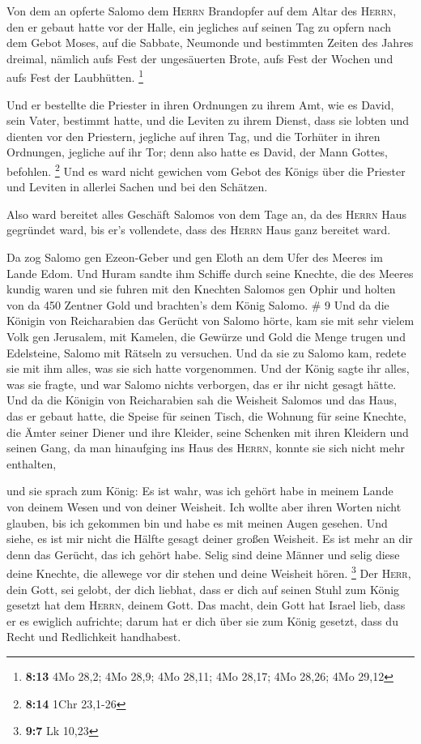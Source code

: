  Von dem an opferte Salomo dem \textsc{Herrn} Brandopfer
auf dem Altar des \textsc{Herrn}, den er gebaut hatte vor der Halle,
 ein jegliches auf seinen Tag zu opfern nach dem Gebot
Moses, auf die Sabbate, Neumonde und bestimmten Zeiten des Jahres
dreimal, nämlich aufs Fest der ungesäuerten Brote, aufs Fest der Wochen
und aufs Fest der Laubhütten. \footnote{\textbf{8:13} 4Mo 28,2; 4Mo
  28,9; 4Mo 28,11; 4Mo 28,17; 4Mo 28,26; 4Mo 29,12}

 Und er bestellte die Priester in ihren Ordnungen zu
ihrem Amt, wie es David, sein Vater, bestimmt hatte, und die Leviten zu
ihrem Dienst, dass sie lobten und dienten vor den Priestern, jegliche
auf ihren Tag, und die Torhüter in ihren Ordnungen, jegliche auf ihr
Tor; denn also hatte es David, der Mann Gottes, befohlen. \footnote{\textbf{8:14}
  1Chr 23,1-26}  Und es ward nicht gewichen vom Gebot des
Königs über die Priester und Leviten in allerlei Sachen und bei den
Schätzen.

 Also ward bereitet alles Geschäft Salomos von dem Tage
an, da des \textsc{Herrn} Haus gegründet ward, bis er's vollendete, dass
des \textsc{Herrn} Haus ganz bereitet ward.

 Da zog Salomo gen Ezeon-Geber und gen Eloth an dem Ufer
des Meeres im Lande Edom.  Und Huram sandte ihm Schiffe
durch seine Knechte, die des Meeres kundig waren und sie fuhren mit den
Knechten Salomos gen Ophir und holten von da 450 Zentner Gold und
brachten's dem König Salomo. \# 9  Und da die Königin von
Reicharabien das Gerücht von Salomo hörte, kam sie mit sehr vielem Volk
gen Jerusalem, mit Kamelen, die Gewürze und Gold die Menge trugen und
Edelsteine, Salomo mit Rätseln zu versuchen. Und da sie zu Salomo kam,
redete sie mit ihm alles, was sie sich hatte vorgenommen. 
Und der König sagte ihr alles, was sie fragte, und war Salomo nichts
verborgen, das er ihr nicht gesagt hätte.  Und da die
Königin von Reicharabien sah die Weisheit Salomos und das Haus, das er
gebaut hatte,  die Speise für seinen Tisch, die Wohnung
für seine Knechte, die Ämter seiner Diener und ihre Kleider, seine
Schenken mit ihren Kleidern und seinen Gang, da man hinaufging ins Haus
des \textsc{Herrn}, konnte sie sich nicht mehr enthalten,

 und sie sprach zum König: Es ist wahr, was ich gehört
habe in meinem Lande von deinem Wesen und von deiner Weisheit.
 Ich wollte aber ihren Worten nicht glauben, bis ich
gekommen bin und habe es mit meinen Augen gesehen. Und siehe, es ist mir
nicht die Hälfte gesagt deiner großen Weisheit. Es ist mehr an dir denn
das Gerücht, das ich gehört habe.  Selig sind deine Männer
und selig diese deine Knechte, die allewege vor dir stehen und deine
Weisheit hören. \footnote{\textbf{9:7} Lk 10,23}  Der
\textsc{Herr}, dein Gott, sei gelobt, der dich liebhat, dass er dich auf
seinen Stuhl zum König gesetzt hat dem \textsc{Herrn}, deinem Gott. Das
macht, dein Gott hat Israel lieb, dass er es ewiglich aufrichte; darum
hat er dich über sie zum König gesetzt, dass du Recht und Redlichkeit
handhabest.


